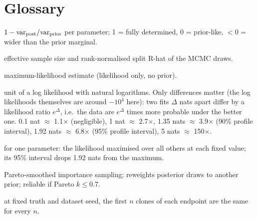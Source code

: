 \documentclass[10pt,a4paper]{article}
\begin{document}
\section{Glossary}\label{sec:glossary}
\begin{description}[style=nextline,leftmargin=1.3em]
\item[Contraction] $1 - \mathrm{var}_{\rm post}/\mathrm{var}_{\rm prior}$ per parameter; 1 = fully determined, 0 = prior-like, $<0$ = wider than the prior marginal.
\item[ESS, $\hat R$] effective sample size and rank-normalised split R-hat of the MCMC draws.
\item[MLE] maximum-likelihood estimate (likelihood only, no prior).
\item[Nat] unit of a log likelihood with natural logarithms. Only differences matter (the log likelihoods themselves are around $-10^4$ here): two fits $\Delta$ nats apart differ by a likelihood ratio $e^{\Delta}$, i.e.\ the data are $e^{\Delta}$ times more probable under the better one. 0.1 nat $\approx$ 1.1$\times$ (negligible), 1 nat $\approx$ 2.7$\times$, 1.35 nats $\approx$ 3.9$\times$ (90\% profile interval), 1.92 nats $\approx$ 6.8$\times$ (95\% profile interval), 5 nats $\approx$ 150$\times$.
\item[Profile likelihood] for one parameter: the likelihood maximised over all others at each fixed value; its 95\% interval drops 1.92 nats from the maximum.
\item[PSIS] Pareto-smoothed importance sampling; reweights posterior draws to another prior; reliable if Pareto $k \le 0.7$.
\item[Nested datasets] at fixed truth and dataset seed, the first $n$ clones of each endpoint are the same for every $n$.
\end{description}
\end{document}
